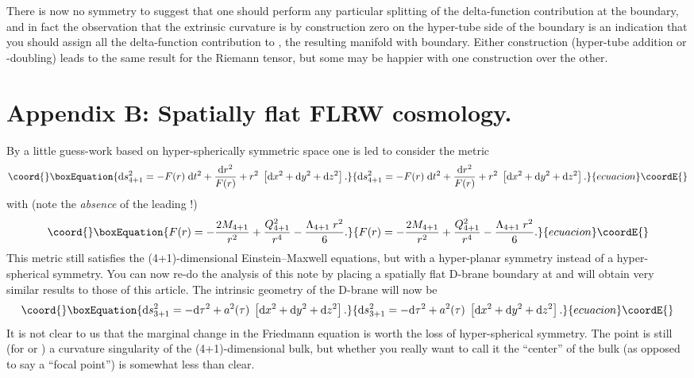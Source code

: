 \documentclass[a4paper,12pt]{article}
\begin{document}
%
There is now no symmetry to suggest that one should perform any
particular splitting of the delta-function contribution at the
boundary, and in fact the observation that the extrinsic curvature is
by construction zero on the hyper-tube side of the boundary is an
indication that you should assign all the delta-function contribution
to \myHighlight{$\M$}\coordHE{}, the resulting manifold with boundary. Either construction
(hyper-tube addition or \coordHE{}-doubling) leads to the same result for
the Riemann tensor, but some may be happier with one construction over
the other.


\section*{Appendix B: Spatially flat FLRW cosmology.}


By a little guess-work based on hyper-spherically symmetric {\RNdS}
space one is led to consider the metric
%
\begin{equation}\coord{}\boxEquation{
\d s^2_{4+1} = 
-  F(r)\; \d t^2 
+{\d r^2\over F(r)} 
+ r^2 \; \left[\d x^2 + \d y^2 + \d z^2 \right].
}{
\d s^2_{4+1} = 
-  F(r)\; \d t^2 
+{\d r^2\over F(r)} 
+ r^2 \; \left[\d x^2 + \d y^2 + \d z^2 \right].
}{ecuacion}\coordE{}\end{equation}
%
with (note the {\em absence} of the leading \coordHE{}!)
%
\begin{equation}\coord{}\boxEquation{
F(r) =  - {2M_{4+1}\over r^2} 
+ {Q_{4+1}^2\over r^4} - {\Lambda_{4+1} \; r^2\over 6}.
}{
F(r) =  - {2M_{4+1}\over r^2} 
+ {Q_{4+1}^2\over r^4} - {\Lambda_{4+1} \; r^2\over 6}.
}{ecuacion}\coordE{}\end{equation}
%
This metric still satisfies the (4+1)-dimensional Einstein--Maxwell
equations, but with a hyper-planar symmetry instead of a
hyper-spherical symmetry. You can now re-do the analysis of this note
by placing a spatially flat D-brane boundary at \coordHE{} and will
obtain very similar results to those of this article. The intrinsic
geometry of the D-brane will now be
%
\begin{equation}\coord{}\boxEquation{
\d s^2_{3+1} = - \d \tau^2  + a^2(\tau) \; \left[\d x^2 + \d y^2 + \d z^2 \right].
}{
\d s^2_{3+1} = - \d \tau^2  + a^2(\tau) \; \left[\d x^2 + \d y^2 + \d z^2 \right].
}{ecuacion}\coordE{}\end{equation}
%
It is not clear to us that the marginal change in the Friedmann
equation is worth the loss of hyper-spherical symmetry. The point
\coordHE{} is still (for \coordHE{} or \coordHE{}) a curvature
singularity of the (4+1)-dimensional bulk, but whether you really want
to call it the ``center'' of the bulk (as opposed to say a ``focal
point'') is somewhat less than clear.
\end{document}
